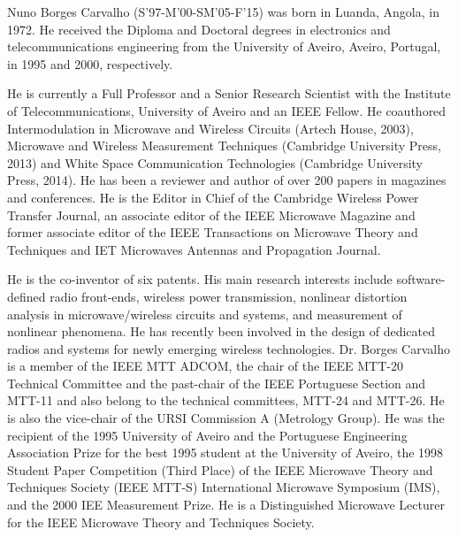 \documentclass[journal]{IEEEtran}
\begin{document}
\begin{IEEEbiography}
{Nuno Borges Carvalho} (S'97-M'00-SM'05-F'15)
was born in Luanda, Angola, in 1972. He received the Diploma and Doctoral degrees in electronics and telecommunications engineering from the University of Aveiro, Aveiro, Portugal, in 1995 and 2000, respectively.

He is currently a Full Professor and a Senior Research Scientist with the Institute of Telecommunications, University of Aveiro and an IEEE Fellow. He coauthored Intermodulation in Microwave and Wireless Circuits (Artech House, 2003), Microwave and Wireless Measurement Techniques (Cambridge University Press, 2013) and White Space Communication Technologies (Cambridge University Press, 2014). He has been a reviewer and author of over 200 papers in magazines and conferences. He is the Editor in Chief of the Cambridge Wireless Power Transfer Journal, an associate editor of the IEEE Microwave Magazine and former associate editor of the IEEE Transactions on Microwave Theory and Techniques and IET Microwaves Antennas and Propagation Journal.

He is the co-inventor of six patents. His main research interests include software-defined radio front-ends, wireless power transmission, nonlinear distortion analysis in microwave/wireless circuits and systems, and measurement of nonlinear phenomena. He has recently been involved in the design of dedicated radios and systems for newly emerging wireless technologies.
Dr. Borges Carvalho is a member of the IEEE MTT ADCOM, the chair of the IEEE MTT-20 Technical Committee and the past-chair of the IEEE Portuguese Section and MTT-11 and also belong to the technical committees, MTT-24 and MTT-26. He is also the vice-chair of the URSI Commission A (Metrology Group). He was the recipient of the 1995 University of Aveiro and the Portuguese Engineering Association Prize for the best 1995 student at the University of Aveiro, the 1998 Student Paper Competition (Third Place) of the IEEE Microwave Theory and Techniques Society (IEEE MTT-S) International Microwave Symposium (IMS), and the 2000 IEE Measurement Prize.
He is a Distinguished Microwave Lecturer for the IEEE Microwave Theory and Techniques Society.

\end{IEEEbiography}
\end{document}
